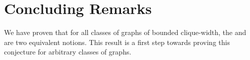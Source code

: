 \section{Concluding Remarks}
\label{sec:conclusion}

We have proven that for all classes of graphs of bounded clique-width, the
 and  are two equivalent notions. This result is a
first step towards proving this conjecture for arbitrary classes of graphs.

